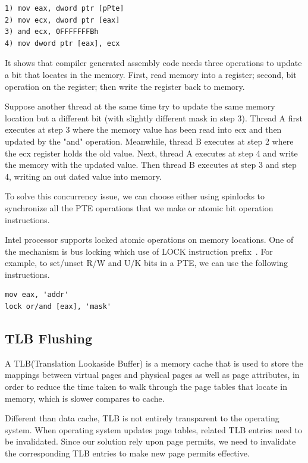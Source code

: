 \begin{lstlisting}[basicstyle=\small] 
1) mov eax, dword ptr [pPte]
2) mov ecx, dword ptr [eax]
3) and ecx, 0FFFFFFFBh
4) mov dword ptr [eax], ecx
\end{lstlisting}

It shows that compiler generated assembly code needs three operations to update a bit that locates in the memory. First, read memory into a register; second, bit operation on the register; then write the register back to memory.

Suppose another thread at the same time try to update the same memory location but a different bit (with slightly different mask in step 3). Thread A first executes at step 3 where the memory value has been read into ecx and then updated by the "and" operation. Meanwhile, thread B executes at step 2 where the ecx register holds the old value. Next, thread A executes at step 4 and write the memory with the updated value. Then thread B executes at step 3 and step 4, writing an out dated value into memory.

To solve this concurrency issue, we can choose either using spinlocks to synchronize all the PTE operations that we make or atomic bit operation instructions.

Intel processor supports locked atomic operations on memory locations. One of the mechanism is bus locking which use of LOCK instruction prefix~\cite{intelmanualchapter8}. For example, to set/unset R/W and U/K bits in a PTE, we can use the following instructions.

\begin{lstlisting}[basicstyle=\small] 
mov eax, 'addr'
lock or/and [eax], 'mask'
\end{lstlisting}

\subsection{TLB Flushing}
A TLB(Translation Lookaside Buffer) is a memory cache that is used to store the mappings between virtual pages and physical pages as well as page attributes, in order to reduce the time taken to walk through the page tables that locate in memory, which is slower compares to cache. 

Different than data cache, TLB is not entirely transparent to the operating system. When operating system updates page tables, related TLB entries need to be invalidated. Since our solution rely upon page permits, we need to invalidate the corresponding TLB entries to make new page permits effective.


